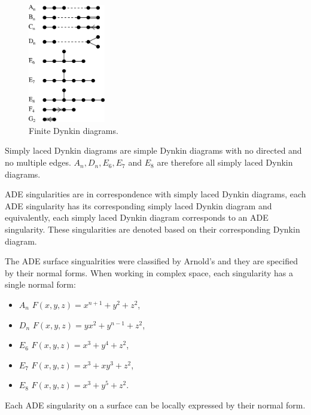 \begin{figure}
    \centerline{\includegraphics[width=0.3\textwidth]{images/img3}}
    \caption[Finite Dynkin diagrams]
    {Finite Dynkin diagrams\cite{wikidynkindiagram}.}
    \label{img:3}
\end{figure}

Simply laced Dynkin diagrams are simple Dynkin diagrams with no directed
and no multiple edges. $A_n, D_n, E_6, E_7$ and $E_8$ are therefore all
simply laced Dynkin diagrams.

ADE singularities are in correspondence with simply laced Dynkin
diagrams, each ADE singularity has its corresponding simply laced Dynkin
diagram and equivalently, each simply laced Dynkin diagram corresponds
to an ADE singularity. These singularities are denoted based on their
corresponding Dynkin diagram.

The ADE surface singualrities were classified by Arnold's
\cite{arnol1972normal} and they are specified by their normal forms.
When working in complex space, each singularity has a single normal form:
\begin{itemize}
    \item $A_n$ \hspace{5mm} $F(x,y,z)=x^{n+1}+y^2+z^2$,
    \item $D_n$ \hspace{5mm} $F(x,y,z)=yx^2+y^{n-1}+z^2$,
    \item $E_6$ \hspace{5mm} $F(x,y,z)=x^3+y^4+z^2$,
    \item $E_7$ \hspace{5mm} $F(x,y,z)=x^3+xy^3+z^2$,
    \item $E_8$ \hspace{5mm} $F(x,y,z)=x^3+y^5+z^2$.
\end{itemize}

Each ADE singularity on a surface can be locally expressed by their
normal form.

